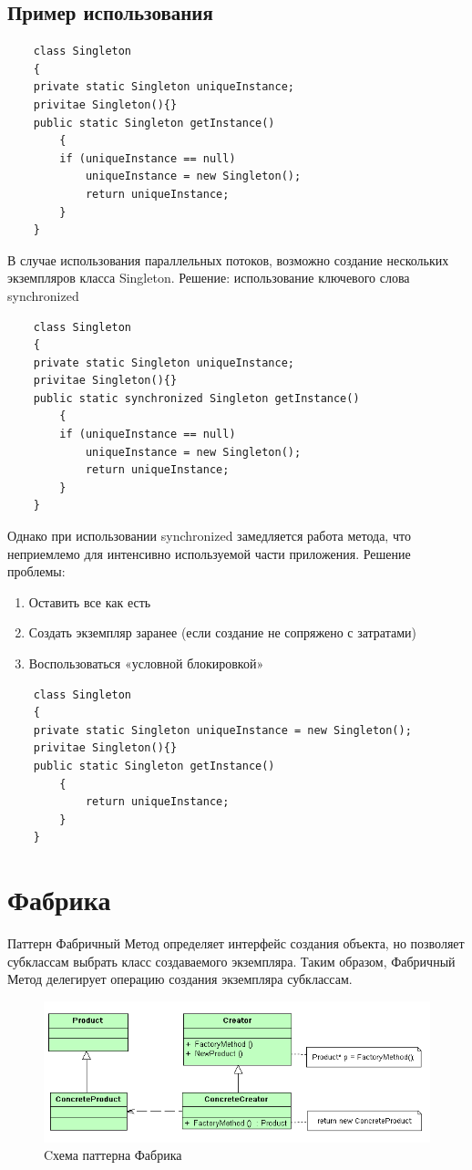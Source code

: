 \subsection{Пример использования}
\begin{lstlisting}
    class Singleton
    {
    private static Singleton uniqueInstance;
    privitae Singleton(){}
    public static Singleton getInstance()
        {
        if (uniqueInstance == null)
            uniqueInstance = new Singleton();
            return uniqueInstance;
        }
    }
\end{lstlisting}
В случае использования параллельных потоков, возможно создание нескольких экземпляров класса Singleton.
Решение: использование ключевого слова synchronized
\begin{lstlisting}
    class Singleton
    {
    private static Singleton uniqueInstance;
    privitae Singleton(){}
    public static synchronized Singleton getInstance()
        {
        if (uniqueInstance == null)
            uniqueInstance = new Singleton();
            return uniqueInstance;
        }
    }
\end{lstlisting}
Однако при использовании synchronized замедляется работа метода, что неприемлемо для интенсивно используемой части приложения.
Решение проблемы:
\begin{enumerate}
\item Оставить все как есть
\item Создать экземпляр заранее (если создание не сопряжено с затратами)
\item Воспользоваться «условной блокировкой»
\end{enumerate}
\begin{lstlisting}
    class Singleton
    {
    private static Singleton uniqueInstance = new Singleton();
    privitae Singleton(){}
    public static Singleton getInstance()
        {
            return uniqueInstance;
        }
    }
\end{lstlisting}

\section{Фабрика}
Паттерн Фабричный Метод определяет интерфейс создания объекта, но позволяет субклассам выбрать класс создаваемого экземпляра. Таким образом, Фабричный Метод делегирует операцию создания экземпляра субклассам.
\begin{figure}[!ht]
\begin{center}
\includegraphics[scale=0.7]{images/pic/pic26-2.png}\caption{Cхема паттерна Фабрика}\label{figure1}
\end{center}
\end{figure}
